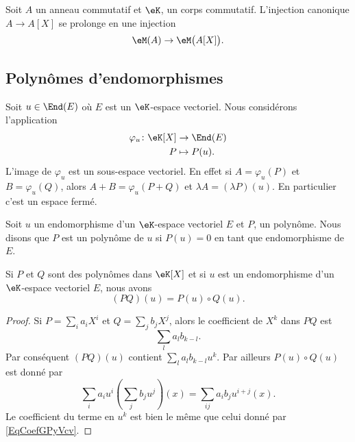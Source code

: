 Soit \( A\) un anneau commutatif et \( \eK\), un corps commutatif. L'injection canonique \( A\to A[X]\) se prolonge en une injection
\begin{equation}
   \eM(A)\to\eM\big( A[X] \big).
\end{equation}

\subsection{Polynômes d'endomorphismes}

Soit \( u\in\End(E)\) où \( E\) est un \( \eK\)-espace vectoriel. Nous considérons l'application
\begin{equation}    \label{EqOVKooeMJuv}
    \begin{aligned}
        \varphi_u\colon \eK[X]&\to \End(E) \\
        P&\mapsto P(u).
    \end{aligned}
\end{equation}
L'image de \( \varphi_u\) est un sous-espace vectoriel. En effet si \( A=\varphi_u(P)\) et \( B=\varphi_u(Q)\), alors \( A+B=\varphi_u(P+Q)\) et \( \lambda A=(\lambda P)(u)\). En particulier c'est un espace fermé.

Soit \( u\) un endomorphisme d'un \( \eK\)-espace vectoriel \( E\) et \( P\), un polynôme. Nous disons que \( P\) est un polynôme  de \( u\) si \( P(u)=0\) en tant que endomorphisme de \( E\).

\begin{lemma}       \label{LemQWvhYb}
    Si \( P\) et \( Q\) sont des polynômes dans \( \eK[X]\) et si \( u\) est un endomorphisme d'un \( \eK\)-espace vectoriel \( E\), nous avons
    \begin{equation}
        (PQ)(u)=P(u)\circ Q(u).
    \end{equation}
\end{lemma}

\begin{proof}
    Si \( P=\sum_i a_iX^i\) et \( Q=\sum_j b_jX^j\), alors le coefficient de \( X^k\) dans \( PQ\) est
    \begin{equation}        \label{EqCoefGPyVcv}
        \sum_la_lb_{k-l}.
    \end{equation}
    Par conséquent \( (PQ)(u)\) contient \( \sum_la_lb_{k-l}u^k\). Par ailleurs \( P(u)\circ Q(u)\) est donné par
    \begin{equation}
        \sum_ia_iu^i\left( \sum_jb_ju^j \right)(x)=\sum_{ij}a_ib_ju^{i+j}(x).
    \end{equation}
    Le coefficient du terme en \( u^k\) est bien le même que celui donné par \eqref{EqCoefGPyVcv}.
\end{proof}

